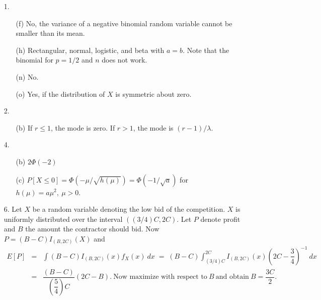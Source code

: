 \begin{enumerate}
	\item[1.] \begin{enumerate}
		
		\item[(f)] No, the variance of a negative binomial random variable cannot be smaller than its mean.
		
		\item[(h)] Rectangular, normal, logistic, and beta with $a=b$.  Note that the binomial for $p=1/2$ and $n$ does not work.
		
		\item[(n)] No.
		
		\item[(o)] Yes, if the distribution of $X$ is symmetric about zero.
		
	\end{enumerate}
	
	\item[2.] \begin{enumerate}
		
		\item[(b)] If $r\le 1$, the mode is zero.  If $r>1$, the mode is $(r-1)/\lambda$.
	\end{enumerate}
	
	\item[4.] \begin{enumerate}
		
		\item[(b)] $2\Phi(-2)$
		
		\item[(c)] $P[X\le 0] = \Phi(-\mu/\sqrt{h(\mu)}) = \Phi(-1/\sqrt{a})$ for $h(\mu)= a\mu^2,\ \mu >0$.
	\end{enumerate} 
	
	\item[6.] Let $X$ be a random variable denoting the low bid of the competition.  $X$ is uniformly distributed over the interval $((3/4)C,2C)$.  Let $P$ denote profit and $B$ the amount the contractor should bid.  Now $P=(B-C)I_{(B,2C)}(X)$ and 
	\begin{eqnarray*}
	E[P] &=& \int (B-C)I_{(B,2C)}(x)f_X(x)\ dx \;=\; (B-C)\int_{(3/4)C}^{2C} I_{(B,2C)}(x)\left(2C-\dfrac{3}{4}\right)^{-1}\ dx \\
	&=& \dfrac{(B-C)}{\left(\dfrac{5}{4}\right)C}(2C-B).\ \text{Now maximize with respect to}\ B\ \text{and obtain}\ B =\dfrac{3C}{2}.
	\end{eqnarray*} 
	

\end{enumerate}
